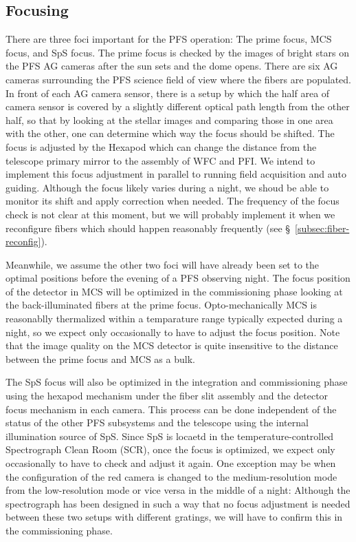 \documentclass[a4paper]{article}
\begin{document}
\subsection{Focusing}
There are three foci important for the PFS operation: The prime focus,
MCS focus, and SpS focus. The prime focus is checked by the images of
bright stars on the PFS AG cameras after the sun sets and the dome
opens. There are six AG cameras surrounding the PFS science field of
view where the fibers are populated. In front of each AG camera
sensor, there is a setup by which the half area of camera sensor is
covered by a slightly different optical path length from the other
half, so that by looking at the stellar images and comparing those in
one area with the other, one can determine which way the focus should
be shifted. The focus is adjusted by the Hexapod which can change the
distance from the telescope primary mirror to the assembly of WFC and
PFI. We intend to implement this focus adjustment in parallel to
running field acquisition and auto guiding. Although the focus likely
varies during a night, we shoud be able to monitor its shift and apply
correction when needed. The frequency of the focus check is not clear
at this moment, but we will probably implement it when we reconfigure
fibers which should happen reasonably frequently (see
\S~\ref{subsec:fiber-reconfig}).

Meanwhile, we assume the other two foci will have already been set to
the optimal positions before the evening of a PFS observing night. The
focus position of the detector in MCS will be optimized in the
commissioning phase looking at the back-illuminated fibers at the
prime focus. Opto-mechanically MCS is reasonablly thermalized within a
temparature range typically expected during a night, so we expect only
occasionally to have to adjust the focus position. Note that the image
quality on the MCS detector is quite insensitive to the distance
between the prime focus and MCS as a bulk.

The SpS focus will also be optimized in the integration and
commissioning phase using the hexapod mechanism under the fiber slit
assembly and the detector focus mechanism in each camera. This process
can be done independent of the status of the other PFS subsystems and
the telescope using the internal illumination source of SpS. Since SpS
is locaetd in the temperature-controlled Spectrograph Clean Room
(SCR), once the focus is optimized, we expect only occasionally to
have to check and adjust it again. One exception may be when the
configuration of the red camera is changed to the medium-resolution
mode from the low-resolution mode or vice versa in the middle of a
night: Although the spectrograph has been designed in such a way that
no focus adjustment is needed between these two setups with different
gratings, we will have to confirm this in the commissioning phase.
\end{document}
